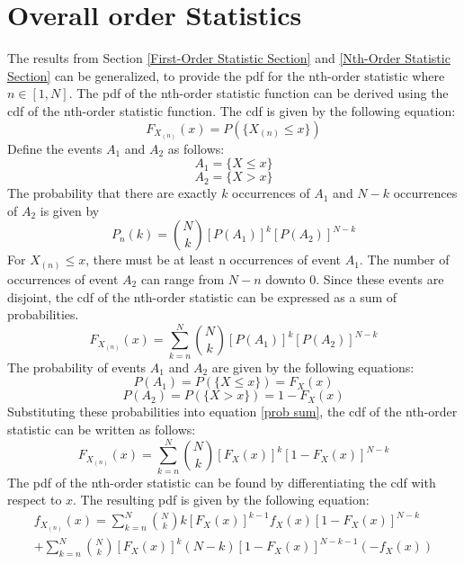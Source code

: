 \documentclass[conference]{IEEEtran}
\begin{document}
\section{Overall order Statistics}
The results from Section \ref{First-Order Statistic Section} and \ref{Nth-Order Statistic Section} can be generalized, to provide the pdf for the nth-order statistic where $n\in[1,N]$. The pdf of the nth-order statistic function can be derived using the cdf of the nth-order statistic function. The cdf is given by the following equation:
\begin{equation}
F_{X_{(n)}}(x) = P(\{X_{(n)} \leq x\})
\end{equation}
Define the events $A_1$ and $A_2$ as follows:
\begin{equation}
A_1 = \{X \leq x\}
\end{equation}
\begin{equation}
A_2 = \{X > x\}
\end{equation}
The probability that there are exactly $k$ occurrences of $A_1$ and $N-k$ occurrences of $A_2$ is given by
\begin{equation}
P_n(k) = \binom{N}{k}[P(A_1)]^k[P(A_2)]^{N-k}
\end{equation}
For $X_{(n)} \leq x$, there must be at least n occurrences of event $A_1$. The number of occurrences of event $A_2$ can range from $N-n$ downto $0$. Since these events are disjoint,  the cdf of the nth-order statistic can be expressed as a sum of probabilities.
\begin{equation}
\label{prob sum}
F_{X_{(n)}}(x) = \sum_{k=n}^{N}\binom{N}{k}[P(A_1)]^k[P(A_2)]^{N-k}
\end{equation}
The probability of events $A_1$ and $A_2$ are given by the following equations:
\begin{equation}
P(A_1) = P(\{X \leq x\}) = F_X(x)
\end{equation}
\begin{equation}
P(A_2) = P(\{X > x\}) = 1 - F_X(x)
\end{equation}
Substituting these probabilities into equation \eqref{prob sum}, the cdf of the nth-order statistic can be written as follows:
\begin{equation}
F_{X_{(n)}}(x) = \sum_{k=n}^{N}\binom{N}{k}[F_X(x)]^k[1-F_X(x)]^{N-k}
\end{equation}
The pdf of the nth-order statistic can be found by differentiating the cdf with respect to $x$. The resulting pdf is given by the following equation:
\begin{equation}
\begin{gathered}
f_{X_{(n)}}(x) = \sum_{k=n}^{N}\binom{N}{k}k[F_X(x)]^{k-1}f_X(x)[1-F_X(x)]^{N-k}\\
 + \sum_{k=n}^{N}\binom{N}{k}[F_X(x)]^{k}(N-k)[1-F_X(x)]^{N-k-1}(-f_X(x))
\end{gathered}
\end{equation}
\end{document}
